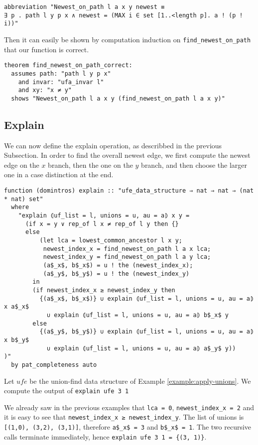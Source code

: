 \begin{lstlisting}
abbreviation "Newest_on_path l a x y newest ≡
∃ p . path l y p x ∧ newest = (MAX i ∈ set [1..<length p]. a ! (p ! i))"
\end{lstlisting}

Then it can easily be shown by computation induction on \lstinline{find_newest_on_path} that our function is correct.

\begin{lstlisting}
theorem find_newest_on_path_correct:
  assumes path: "path l y p x"
    and invar: "ufa_invar l"
    and xy: "x ≠ y"
  shows "Newest_on_path l a x y (find_newest_on_path l a x y)"
\end{lstlisting}

\subsection{Explain}

We can now define the explain operation, as describbed in the previous Subsection.
In order to find the overall newest edge, we first compute the newest edge on the $x$ branch, then the one on the $y$ branch, and then choose the larger one in a case distinction at the end.

\begin{lstlisting}
function (domintros) explain :: "ufe_data_structure ⇒ nat ⇒ nat ⇒ (nat * nat) set"
  where
    "explain ⦇uf_list = l, unions = u, au = a⦈ x y =
      (if x = y ∨ rep_of l x ≠ rep_of l y then {}
      else
          (let lca = lowest_common_ancestor l x y;
           newest_index_x = find_newest_on_path l a x lca;
           newest_index_y = find_newest_on_path l a y lca;
           (a$_x$, b$_x$) = u ! the (newest_index_x);
           (a$_y$, b$_y$) = u ! the (newest_index_y)
        in
        (if newest_index_x ≥ newest_index_y then
          {(a$_x$, b$_x$)} ∪ explain ⦇uf_list = l, unions = u, au = a⦈ x a$_x$
            ∪ explain ⦇uf_list = l, unions = u, au = a⦈ b$_x$ y
        else
          {(a$_y$, b$_y$)} ∪ explain ⦇uf_list = l, unions = u, au = a⦈ x b$_y$
            ∪ explain ⦇uf_list = l, unions = u, au = a⦈ a$_y$ y))
)"
  by pat_completeness auto
\end{lstlisting}

\begin{exmp}
Let $ufe$ be the union-find data structure of Example \ref{example:apply-unions}. We compute the output of \lstinline|explain ufe 3 1|

We already saw in the previous examples that \lstinline|lca = 0|, \lstinline|newest_index_x = 2|
and it is easy to see that \lstinline|newest_index_x ≥ newest_index_y|. The list of unions is \lstinline|[(1,0), (3,2), (3,1)]|, therefore \lstinline|a$_x$ = 3| and \lstinline|b$_x$ = 1|. The two recursive calls terminate immediately, hence \lstinline|explain ufe 3 1 = {(3, 1)}|.
\end{exmp}

